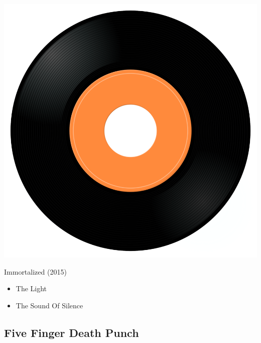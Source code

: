 \begin{minipage}[t]{0.25\textwidth}
\captionsetup{type=figure}
\includegraphics[width=\textwidth]{Images/cover.png}
\caption*{Immortalized (2015)}
\end{minipage}
\begin{minipage}[t]{0.25\textwidth}\vspace{0pt}
\begin{itemize}[nosep,leftmargin=1em,labelwidth=*,align=left]
	\setlength{\itemsep}{0pt}
	\item The Light
	\item The Sound Of Silence
\end{itemize}
\end{minipage}

\subsection{Five Finger Death Punch}

